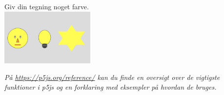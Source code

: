 \documentclass{ucph-handout}
\newcounter{handout}
\newcommand{\Ark}{Ark \#\arabic{handout} -- }
\begin{document}
\begin{exercisebox}[adjusted title=Farver]
\vspace{3mm}
\noindent
{}
\vspace{3mm}

Giv din tegning noget farve.\\

\quad\quad\includegraphics[width=0.35\textwidth]{nyebilleder/Screenshot 2021-04-15 at 11.40.20.png} 

\vspace{3mm}
\textit{På \url{https://p5js.org/reference/} kan du finde en oversigt over de vigtigste funktioner i p5js og en forklaring med eksempler på hvordan de bruges. }

\end{exercisebox}

\newpage
{}


\renewcommand{\Title}{\Ark Tilføj elementer}%
\end{document}
